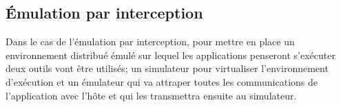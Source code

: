 \subsection{Émulation par interception}

Dans le cas de l'émulation par interception, pour mettre en place un
  environnement distribué émulé sur lequel les applications penseront
  s'exécuter deux outils vont être utilisés; un simulateur pour virtualiser
l'environnement d'exécution et un émulateur qui va attraper toutes les
communications de l'application avec l'hôte et qui les transmettra ensuite au
simulateur.

